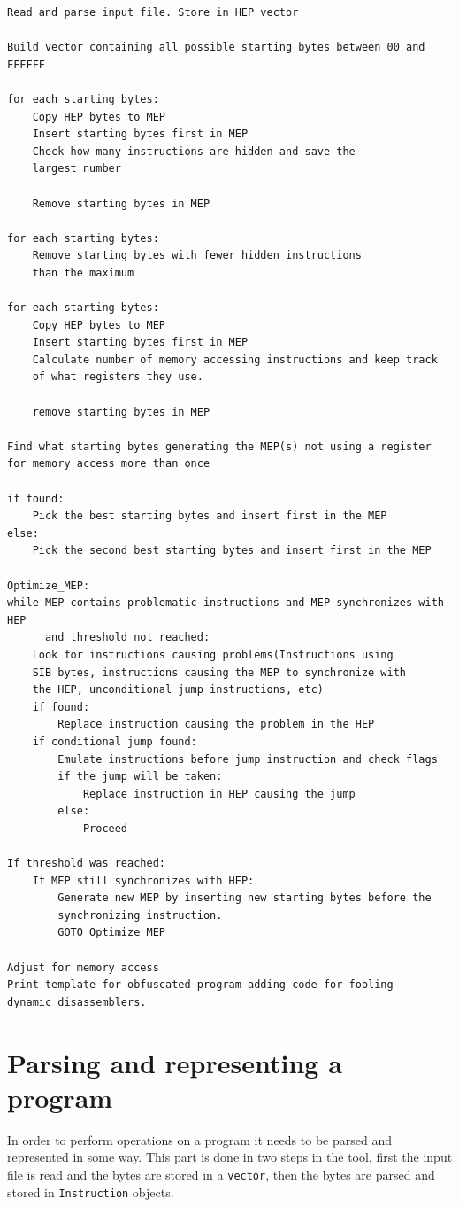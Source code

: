\documentclass[11pt,twoside]{eitExjobb}
\begin{document}
\begin{Verbatim}[fontsize=\tiny]
Read and parse input file. Store in HEP vector

Build vector containing all possible starting bytes between 00 and FFFFFF

for each starting bytes:
	Copy HEP bytes to MEP
	Insert starting bytes first in MEP
	Check how many instructions are hidden and save the 
	largest number

	Remove starting bytes in MEP

for each starting bytes:
	Remove starting bytes with fewer hidden instructions 
	than the maximum

for each starting bytes:
	Copy HEP bytes to MEP
	Insert starting bytes first in MEP
	Calculate number of memory accessing instructions and keep track
	of what registers they use.

	remove starting bytes in MEP

Find what starting bytes generating the MEP(s) not using a register
for memory access more than once

if found:
	Pick the best starting bytes and insert first in the MEP
else:
	Pick the second best starting bytes and insert first in the MEP

Optimize_MEP:
while MEP contains problematic instructions and MEP synchronizes with HEP
      and threshold not reached:
	Look for instructions causing problems(Instructions using 
	SIB bytes, instructions causing the MEP to synchronize with 
	the HEP, unconditional jump instructions, etc)
	if found:
		Replace instruction causing the problem in the HEP
	if conditional jump found:
		Emulate instructions before jump instruction and check flags
		if the jump will be taken:
			Replace instruction in HEP causing the jump
		else:
			Proceed

If threshold was reached:
	If MEP still synchronizes with HEP:
		Generate new MEP by inserting new starting bytes before the 
		synchronizing instruction.
		GOTO Optimize_MEP

Adjust for memory access
Print template for obfuscated program adding code for fooling
dynamic disassemblers.
\end{Verbatim}

\section{Parsing and representing a program}
In order to perform operations on a program it needs to be parsed and represented in some way. This part is done in two steps in the tool, first the input file is read and the bytes are stored in a \texttt{vector}, then the bytes are parsed and stored in \texttt{Instruction} objects. 
\end{document}
